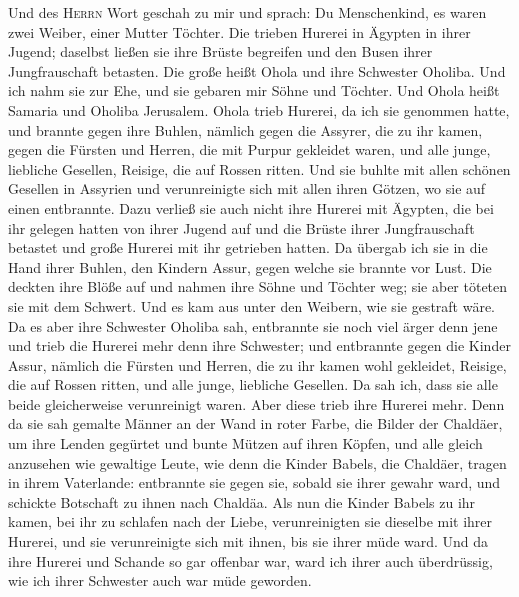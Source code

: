  Und des \textsc{Herrn} Wort geschah zu mir und sprach:
 Du Menschenkind, es waren zwei Weiber, einer Mutter
Töchter.  Die trieben Hurerei in Ägypten in ihrer Jugend;
daselbst ließen sie ihre Brüste begreifen und den Busen ihrer
Jungfrauschaft betasten.  Die große heißt Ohola und ihre
Schwester Oholiba. Und ich nahm sie zur Ehe, und sie gebaren mir Söhne
und Töchter. Und Ohola heißt Samaria und Oholiba Jerusalem.
 Ohola trieb Hurerei, da ich sie genommen hatte, und
brannte gegen ihre Buhlen, nämlich gegen die Assyrer, die zu ihr kamen,
 gegen die Fürsten und Herren, die mit Purpur gekleidet
waren, und alle junge, liebliche Gesellen, Reisige, die auf Rossen
ritten.  Und sie buhlte mit allen schönen Gesellen in
Assyrien und verunreinigte sich mit allen ihren Götzen, wo sie auf einen
entbrannte.  Dazu verließ sie auch nicht ihre Hurerei mit
Ägypten, die bei ihr gelegen hatten von ihrer Jugend auf und die Brüste
ihrer Jungfrauschaft betastet und große Hurerei mit ihr getrieben
hatten.  Da übergab ich sie in die Hand ihrer Buhlen, den
Kindern Assur, gegen welche sie brannte vor Lust.  Die
deckten ihre Blöße auf und nahmen ihre Söhne und Töchter weg; sie aber
töteten sie mit dem Schwert. Und es kam aus unter den Weibern, wie sie
gestraft wäre.  Da es aber ihre Schwester Oholiba sah,
entbrannte sie noch viel ärger denn jene und trieb die Hurerei mehr denn
ihre Schwester;  und entbrannte gegen die Kinder Assur,
nämlich die Fürsten und Herren, die zu ihr kamen wohl gekleidet,
Reisige, die auf Rossen ritten, und alle junge, liebliche Gesellen.
 Da sah ich, dass sie alle beide gleicherweise
verunreinigt waren.  Aber diese trieb ihre Hurerei mehr.
Denn da sie sah gemalte Männer an der Wand in roter Farbe, die Bilder
der Chaldäer,  um ihre Lenden gegürtet und bunte Mützen
auf ihren Köpfen, und alle gleich anzusehen wie gewaltige Leute, wie
denn die Kinder Babels, die Chaldäer, tragen in ihrem Vaterlande:
 entbrannte sie gegen sie, sobald sie ihrer gewahr ward,
und schickte Botschaft zu ihnen nach Chaldäa.  Als nun
die Kinder Babels zu ihr kamen, bei ihr zu schlafen nach der Liebe,
verunreinigten sie dieselbe mit ihrer Hurerei, und sie verunreinigte
sich mit ihnen, bis sie ihrer müde ward.  Und da ihre
Hurerei und Schande so gar offenbar war, ward ich ihrer auch
überdrüssig, wie ich ihrer Schwester auch war müde geworden.
